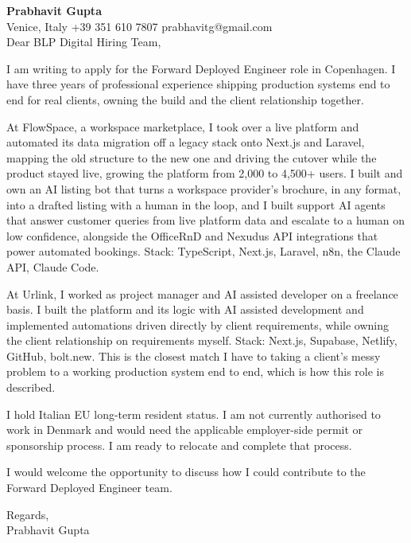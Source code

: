 \documentclass[a4paper,10.5pt]{article}
\begin{document}
\textbf{Prabhavit Gupta}\\
Venice, Italy \textbar{} +39 351 610 7807 \textbar{} prabhavitg@gmail.com\\[10pt]
Dear BLP Digital Hiring Team,

I am writing to apply for the Forward Deployed Engineer role in Copenhagen. I have three years of professional experience shipping production systems end to end for real clients, owning the build and the client relationship together.

At FlowSpace, a workspace marketplace, I took over a live platform and automated its data migration off a legacy stack onto Next.js and Laravel, mapping the old structure to the new one and driving the cutover while the product stayed live, growing the platform from 2,000 to 4,500+ users. I built and own an AI listing bot that turns a workspace provider's brochure, in any format, into a drafted listing with a human in the loop, and I built support AI agents that answer customer queries from live platform data and escalate to a human on low confidence, alongside the OfficeRnD and Nexudus API integrations that power automated bookings. Stack: TypeScript, Next.js, Laravel, n8n, the Claude API, Claude Code.

At Urlink, I worked as project manager and AI assisted developer on a freelance basis. I built the platform and its logic with AI assisted development and implemented automations driven directly by client requirements, while owning the client relationship on requirements myself. Stack: Next.js, Supabase, Netlify, GitHub, bolt.new. This is the closest match I have to taking a client's messy problem to a working production system end to end, which is how this role is described.

I hold Italian EU long-term resident status. I am not currently authorised to work in Denmark and would need the applicable employer-side permit or sponsorship process. I am ready to relocate and complete that process.

I would welcome the opportunity to discuss how I could contribute to the Forward Deployed Engineer team.

Regards,\\
Prabhavit Gupta
\end{document}
